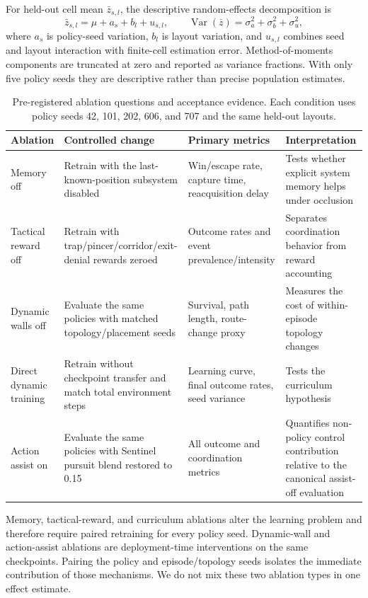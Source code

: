 \documentclass[journal]{IEEEtran}
\begin{document}
For held-out cell mean $\bar z_{s,l}$, the descriptive random-effects decomposition is
\begin{equation}
\bar z_{s,l}=\mu+a_s+b_l+u_{s,l},\qquad
\operatorname{Var}(\bar z)=\sigma_a^2+\sigma_b^2+\sigma_u^2,
\end{equation}
where $a_s$ is policy-seed variation, $b_l$ is layout variation, and $u_{s,l}$ combines seed and layout interaction with finite-cell estimation error. Method-of-moments components are truncated at zero and reported as variance fractions. With only five policy seeds they are descriptive rather than precise population estimates.

\begin{table}[t]
\centering
\caption{Pre-registered ablation questions and acceptance evidence. Each condition uses policy seeds 42, 101, 202, 606, and 707 and the same held-out layouts.}
\label{tab:ablation_design}
\footnotesize
\begin{tabular}{p{2.5cm}p{3.4cm}p{4.1cm}p{4.0cm}}
\toprule
Ablation & Controlled change & Primary metrics & Interpretation \\
\midrule
Memory off & Retrain with the last-known-position subsystem disabled & Win/escape rate, capture time, reacquisition delay & Tests whether explicit system memory helps under occlusion \\
Tactical reward off & Retrain with trap/pincer/corridor/exit-denial rewards zeroed & Outcome rates and event prevalence/intensity & Separates coordination behavior from reward accounting \\
Dynamic walls off & Evaluate the same policies with matched topology/placement seeds & Survival, path length, route-change proxy & Measures the cost of within-episode topology changes \\
Direct dynamic training & Retrain without checkpoint transfer and match total environment steps & Learning curve, final outcome rates, seed variance & Tests the curriculum hypothesis \\
Action assist on & Evaluate the same policies with Sentinel pursuit blend restored to 0.15 & All outcome and coordination metrics & Quantifies non-policy control contribution relative to the canonical assist-off evaluation \\
\bottomrule
\end{tabular}
\end{table}

Memory, tactical-reward, and curriculum ablations alter the learning problem and therefore require paired retraining for every policy seed. Dynamic-wall and action-assist ablations are deployment-time interventions on the same checkpoints. Pairing the policy and episode/topology seeds isolates the immediate contribution of those mechanisms. We do not mix these two ablation types in one effect estimate.
\end{document}
